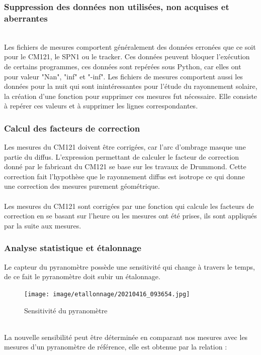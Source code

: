 \documentclass[12pt,a4paper]{article}
\begin{document}
\begin{flushleft}
\subsubsection{Suppression des données non utilisées, non acquises et aberrantes}

~\\
Les fichiers de mesures comportent généralement des données erronées que ce soit pour le CM121, le SPN1 ou le tracker. Ces données peuvent bloquer l'exécution de certains programmes, ces données sont repérées sous Python, car elles ont pour valeur "Nan", "inf" et "-inf". Les fichiers de mesures comportent aussi les données pour la nuit qui sont inintéressantes pour l'étude du rayonnement solaire, la création d'une fonction pour supprimer ces mesures fut nécessaire. Elle consiste à repérer ces valeurs et à supprimer les lignes correspondantes.

\subsubsection{Calcul des facteurs de correction}

Les mesures du CM121 doivent être corrigées, car l'arc d'ombrage masque une partie du diffus. L'expression permettant de calculer le facteur de correction donné par le fabricant du CM121 se base sur les travaux de Drummond. Cette correction fait l'hypothèse que le rayonnement diffus est isotrope ce qui donne une correction des mesures purement géométrique.\\
~\\
Les mesures du CM121 sont corrigées par une fonction qui calcule les facteurs de correction en se basant sur l'heure ou les mesures ont été prises, ils sont appliqués par la suite aux mesures.

\subsubsection{Analyse statistique et étalonnage}

Le capteur du pyranomètre possède une sensitivité qui change à travers le temps, de ce fait le pyranomètre doit subir un étalonnage. 

\begin{figure}[H]
\centering
\texttt{[image: image/etallonnage/20210416\_093654.jpg]} 
\caption{Sensitivité du pyranomètre}  
\end{figure}
~\\
La nouvelle sensibilité peut être déterminée en comparant nos mesures avec les mesures d'un pyranomètre de référence, elle est obtenue par la relation :


\end{flushleft}
\end{document}
